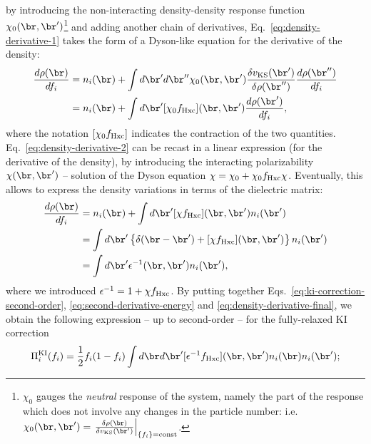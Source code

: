 %
by introducing the non-interacting density-density response function $\chi_0(\br,\br')$\footnote{$\chi_0$ gauges the \emph{neutral} response of the system, namely the part of the response which does not involve any changes in the particle number: i.e. $\chi_0(\br,\br') = \left. \frac{\delta\rho(\br)}{\delta v_{\rm KS}(\br')} \right|_{\{ f_i \} = {\rm const}}$.} and adding another chain of derivatives, Eq.~\eqref{eq:density-derivative-1} takes the form of a Dyson-like equation for the derivative of the density:
%
\begin{equation}
    \begin{split}
    \frac{d\rho(\br)}{df_i} &= n_i(\br) + \int d\br' d\br'' \chi_0(\br,\br') \frac{\delta v_{\rm KS}(\br')}{\delta \rho(\br'')} \frac{d\rho(\br'')}{df_i} \\
    &= n_i(\br) + \int d\br' [\chi_0 f_{\rm Hxc}](\br,\br') \frac{d\rho(\br')}{df_i} ,
    \end{split}
    \label{eq:density-derivative-2}
\end{equation}
%
where the notation $[\chi_0 f_{\rm Hxc}]$ indicates the contraction of the two quantities. Eq.~\eqref{eq:density-derivative-2} can be recast in a linear expression (for the derivative of the density), by introducing the interacting polarizability $\chi(\br,\br')$ -- solution of the Dyson equation $\chi = \chi_0 + \chi_0 f_{\rm Hxc} \chi$. Eventually, this allows to express the density variations in terms of the dielectric matrix:
%
\begin{equation}
    \begin{split}
    \frac{d\rho(\br)}{df_i} &= n_i(\br) + \int d\br' [\chi f_{\rm Hxc}](\br,\br') n_i(\br') \\
    &= \int d\br' \left\{ \delta(\br-\br') + [\chi f_{\rm Hxc}](\br,\br') \right\} n_i(\br') \\
    &= \int d\br' \epsilon^{-1}(\br,\br') n_i(\br') ,
    \end{split}
    \label{eq:density-derivative-final}
\end{equation}
%
where we introduced $\epsilon^{-1} = 1 + \chi f_{\rm Hxc}$. By putting together Eqs.~\eqref{eq:ki-correction-second-order}, \eqref{eq:second-derivative-energy} and \eqref{eq:density-derivative-final}, we obtain the following expression -- up to second-order -- for the fully-relaxed KI correction
%
\begin{equation}
    \Pi_i^{\rm KI}(f_i) = \frac{1}{2} f_i(1-f_i) \int d\br d\br' [\epsilon^{-1} f_{\rm Hxc}](\br,\br') n_i(\br) n_i(\br') ;
    \label{eq:relaxed-ki-second-order}
\end{equation}
